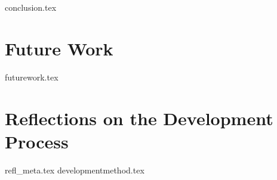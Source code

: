 {conclusion.tex}
\chapter{Future Work}
{futurework.tex}
\chapter{Reflections on the Development Process}
{refl_meta.tex}
{developmentmethod.tex}

